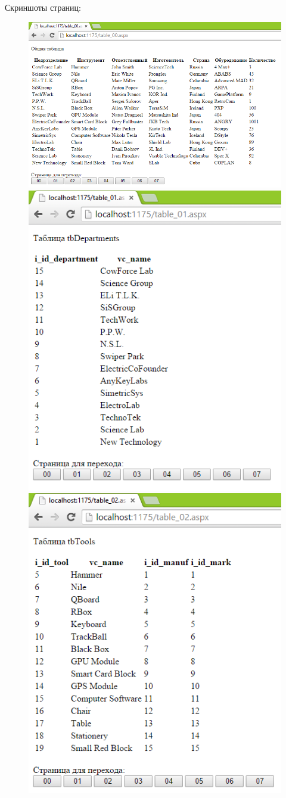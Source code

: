 \documentclass[pscyr]{hedlab}
\begin{document}
  Скриншоты страниц:
  \begin{figure}[h!]
    \center
    \includegraphics[width=.8\textwidth]{lab03_01}
    \includegraphics[width=.47\textwidth]{lab03_02} \hspace{1em}
    \includegraphics[width=.47\textwidth]{lab03_03}
  \end{figure}
\end{document}
